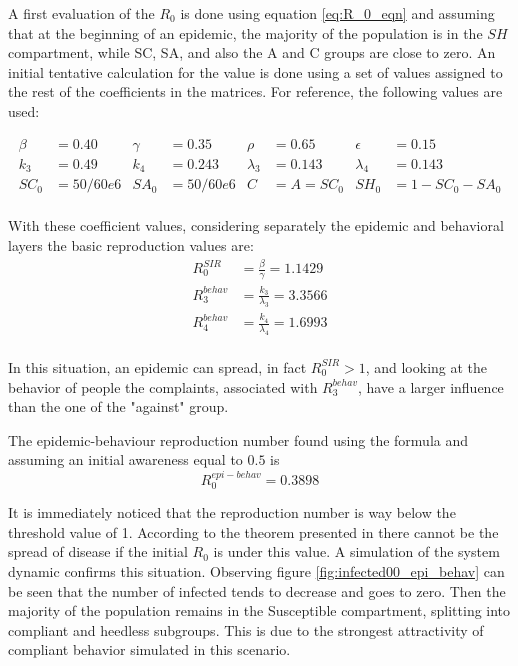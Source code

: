 A first evaluation of the $R_0$ is done using equation \eqref{eq:R_0_eqn} and assuming that at the beginning of an epidemic, the majority of the population is in the $SH$ compartment, while SC, SA, and also the A and C groups are close to zero. 
An initial tentative calculation for the value is done using a set of values assigned to the rest of the coefficients in the matrices.
For reference, the following values are used:

\begin{align*}
\beta &= 0.40  &\gamma &= 0.35 & \rho &= 0.65 &  \epsilon &= 0.15 \\
k_3 &= 0.49 & k_4 &= 0.243 & \lambda_3 &= 0.143 & \lambda_4 &= 0.143 \\
SC_0 & = 50/60e6 & SA_0 &= 50/60e6 & C &= A = SC_0 & SH_0 & = 1 - SC_0- SA_0\\ 	
\end{align*}


With these coefficient values, considering separately the epidemic and behavioral layers the basic reproduction values are:
 \begin{align*}
 	R_0^{SIR} &= \frac{\beta}{\gamma} = 1.1429 \\
 	R_3^{behav} & = \frac{k_3}{\lambda_3} =  3.3566  \\
 	R_4^{behav} & = \frac{k_4}{\lambda_4} = 1.6993 \\
 \end{align*}
   
In this situation, an epidemic can spread, in fact $R_0^{SIR} >1$, and looking at the behavior of people the complaints, associated with $R_3^{behav}$, have a larger influence than the one of the "against" group.

The epidemic-behaviour reproduction number found using the formula and assuming an initial awareness equal to $0.5$ is 
\[R_0^{epi-behav} = 0.3898\]

It is immediately noticed that the reproduction number is way below the threshold value of 1. According to the theorem presented in \cite{arino2007} there cannot be the spread of disease if the initial $R_0$ is under this value. A simulation of the system dynamic confirms this situation. Observing figure \ref{fig:infected00_epi_behav} can be seen that the number of infected tends to decrease and goes to zero. Then the majority of the population remains in the Susceptible compartment, splitting into compliant and heedless subgroups. This is due to the strongest attractivity of compliant behavior simulated in this scenario.  

